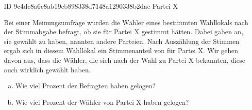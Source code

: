 \begin{exercise}
      {ID-9c4dc8a6c8ab19cb898338d7148a1290338b2dac}
      {Partei X}
  \ifproblem\problem\par
    Bei einer Meinungsumfrage wurden die Wähler eines bestimmten Wahllokals
    nach der Stimmabgabe befragt, ob sie für Partei X gestimmt hätten.
    Dabei gaben  an, sie gewählt zu haben,  nannten andere
    Parteien. Nach Auszählung der Stimmen ergab sich in diesem Wahllokal
    ein Stimmenanteil von  für Partei X. Wir gehen davon aus,
    dass die Wähler, die sich nach der Wahl zu Partei X bekannten,
    diese auch wirklich gewählt haben.
    \begin{enumerate}[a)]
      \item Wie viel Prozent der Befragten haben gelogen?
      \item Wie viel Prozent der Wähler von Partei X haben gelogen?
    \end{enumerate}
  \fi
\end{exercise}
